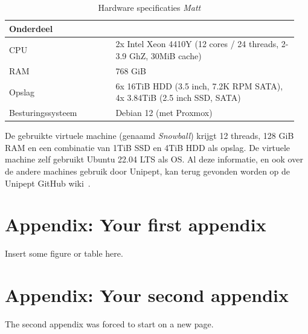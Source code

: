 \documentclass[11pt,dutch,faculty=we,layout=titlefont,underline=false,titleUppercase=true,titleUnderline=true]{ugent2016-report}
\begin{document}
    \begin{table}[h!]
        \centering
        \begin{tabular}{p{0.35\linewidth} p{0.6\linewidth}}
            Onderdeel         &                                                                           \\
            \hline\hline
            CPU               & 2x Intel Xeon 4410Y (12 cores / 24 threads, 2-3.9 GhZ, 30MiB cache)       \\
            RAM               & 768 GiB                                                                   \\
            Opslag            & 6x 16TiB HDD (3.5 inch, 7.2K RPM SATA), 4x 3.84TiB (2.5 inch SSD, SATA) \\
            Besturingssysteem & Debian 12 (met Proxmox)                                                   \\
            \hline
        \end{tabular}
        \caption{Hardware specificaties \textit{Matt}}
        \label{tab:Matt_hardware}
    \end{table}

    De gebruikte virtuele machine (genaamd \textit{Snowball}) krijgt 12 threads, 128 GiB RAM en een combinatie van 1TiB SSD en 4TiB HDD als opslag.
    De virtuele machine zelf gebruikt Ubuntu 22.04 LTS als OS\@.
    Al deze informatie, en ook over de andere machines gebruik door Unipept, kan terug gevonden worden op de Unipept GitHub wiki~\cite{unipept_infrastructure}.

    


    \printbibliography[heading=bibintoc,title={Referenties}] %


    \appendix


    \section{Appendix: Your first appendix}
    Insert some figure or table here.

    \newpage


    \section{Appendix: Your second appendix}
    The second appendix was forced to start on a new page.
\end{document}
